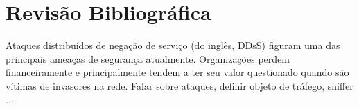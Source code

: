 \chapter[Revisão Bibliográfica]{Revisão Bibliográfica}
Ataques distribuídos de negação de serviço (do inglês, DDsS) figuram uma das principais ameaças de segurança atualmente. Organizações perdem financeiramente e principalmente tendem a ter seu valor questionado quando são vítimas de invasores na rede.
Falar sobre ataques, definir objeto de tráfego, sniffer ...
   

